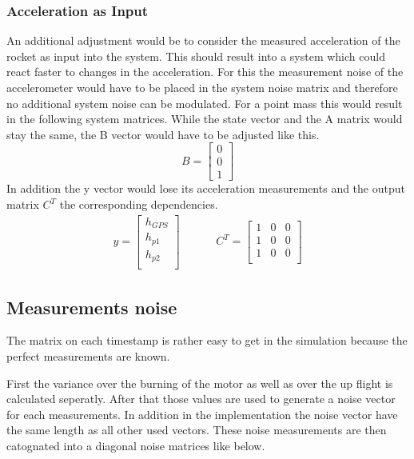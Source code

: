 \subsubsection{Acceleration as Input}
An additional adjustment would be to consider the measured acceleration of the rocket as input into the system.
This should result into a system which could react faster to changes in the acceleration.
For this the measurement noise of the accelerometer would have to be placed in the system noise matrix 
and therefore no additional system noise can be modulated.
For a point mass this would result in the following system matrices.
While the state vector and the A matrix would stay the same, the B vector would have to be adjusted like this.
$$ B = \begin{bmatrix}
        0 \\
        0 \\
        1
       \end{bmatrix}
$$
In addition the y vector would lose its acceleration measurements and the output matrix $C^T$ the corresponding dependencies.
\begin{align*}
 y = \begin{bmatrix}
      h_{GPS} \\
      h_{p1} \\
      h_{p2} \\
     \end{bmatrix}
      & \hspace{1cm}
 C^T = \begin{bmatrix}
        1 & 0 & 0 \\
        1 & 0 & 0 \\
        1 & 0 & 0 \\
       \end{bmatrix}
\end{align*}

\subsection{Measurements noise}
The matrix on each timestamp is rather easy to get in the simulation because the perfect measurements are known.

First the variance over the burning of the motor as well as over the up flight is calculated seperatly.
After that those values are used to generate a noise vector for each measurements.
In addition in the implementation the noise vector have the same length as all other used vectors.
These noise measurements are then catognated into a diagonal noise matrices like below.

